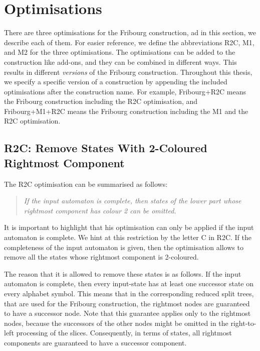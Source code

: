 \section{Optimisations}
\label{3_optimisations}
There are three optimisations for the Fribourg construction, ad in this section, we describe each of them. For easier reference, we define the abbreviations R2C, M1, and M2 for the three optimisations. The optimisations can be added to the construction like add-ons, and they can be combined in different ways. This results in different \textit{versions} of the Fribourg construction. Throughout this thesis, we specify a specific version of a construction by appending the included optimisations after the construction name. For example, Fribourg+R2C means the Fribourg construction including the R2C optimisation, and Fribourg+M1+R2C means the Fribourg construction including the M1 and the R2C optimisation.

\subsection{R2C: Remove States With 2-Coloured Rightmost Component}

The R2C optimisation can be summarised as follows:

\begin{quote}
\centering
\textit{If the input automaton is complete, then states of the lower part whose\\rightmost component has colour 2 can be omitted.}
\end{quote}

It is important to highlight that his optimisation can only be applied if the input automaton is complete. We hint at this restriction by the letter C in R2C. If the completeness of the input automaton is given, then the optimisation allows to remove all the states whose rightmost component is 2-coloured. 

The reason that it is allowed to remove these states is as follows. If the input automaton is complete, then every input-state has at least one successor state on every alphabet symbol. This means that in the corresponding reduced split trees, that are used for the Fribourg construction, the rightmost nodes are guaranteed to have a successor node. Note that this guarantee applies only to the rightmost nodes, because the successors of the other nodes might be omitted in the right-to-left processing of the slices. Consequently, in terms of states, all rightmost components are guaranteed to have a successor component. 

